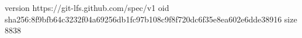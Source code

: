 version https://git-lfs.github.com/spec/v1
oid sha256:8f9bfb64c3232f04a69256db1fc97b108c9f8f720dc6f35e8ea602e6dde38916
size 8838
